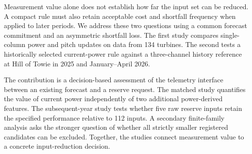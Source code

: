 Measurement value alone does not establish how far the input set can be reduced. A compact rule must also retain acceptable cost and shortfall frequency when applied to later periods. We address these two questions using a common forecast commitment and an asymmetric shortfall loss. The first study compares single-column power and pitch updates on data from 134 turbines. The second tests a historically selected current-power rule against a three-channel history reference at Hill of Towie in 2025 and January--April 2026.

The contribution is a decision-based assessment of the telemetry interface between an existing forecast and a reserve request. The matched study quantifies the value of current power independently of two additional power-derived features. The subsequent-year study tests whether five raw reserve inputs retain the specified performance relative to 112 inputs. A secondary finite-family analysis asks the stronger question of whether all strictly smaller registered candidates can be excluded. Together, the studies connect measurement value to a concrete input-reduction decision.
